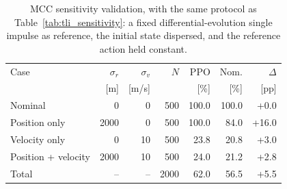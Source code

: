 \begin{table}[hbt!]
\centering
\small
\caption{MCC sensitivity validation, with the same protocol as Table~\ref{tab:tli_sensitivity}: a fixed differential-evolution single impulse as reference, the initial state dispersed, and the reference action held constant.}
\label{tab:mcc_sensitivity}
\begin{tabular}{lrrrrrr}
\toprule
Case & $\sigma_r$ & $\sigma_v$ & $N$ & PPO & Nom. & $\Delta$ \\
 & [m] & [m/s] & & [\%] & [\%] & [pp] \\
\midrule
Nominal & 0 & 0 & 500 & 100.0 & 100.0 & +0.0 \\
Position only & 2000 & 0 & 500 & 100.0 & 84.0 & +16.0 \\
Velocity only & 0 & 10 & 500 & 23.8 & 20.8 & +3.0 \\
Position + velocity & 2000 & 10 & 500 & 24.0 & 21.2 & +2.8 \\
\midrule
Total & -- & -- & 2000 & 62.0 & 56.5 & +5.5 \\
\bottomrule
\end{tabular}
\end{table}